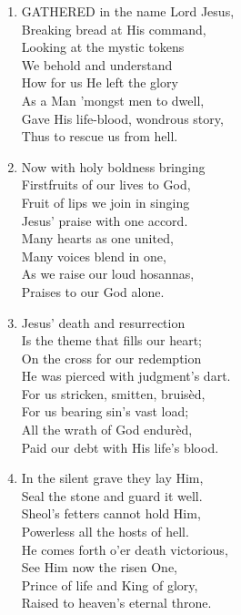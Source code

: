 \begin{enumerate}
    \item GATHERED in the name Lord Jesus, \\
        Breaking bread at His command, \\
        Looking at the mystic tokens \\
        We behold and understand \\
        How for us He left the glory \\
        As a Man 'mongst men to dwell, \\
        Gave His life-blood, wondrous story, \\
        Thus to rescue us from hell.

    \item Now with holy boldness bringing \\
        Firstfruits of our lives to God, \\
        Fruit of lips we join in singing \\
        Jesus' praise with one accord. \\
        Many hearts as one united, \\
        Many voices blend in one, \\
        As we raise our loud hosannas, \\
        Praises to our God alone.

    \item Jesus' death and resurrection \\
        Is the theme that fills our heart; \\
        On the cross for our redemption \\
        He was pierced with judgment's dart. \\
        For us stricken, smitten, bruis\`ed, \\
        For us bearing sin's vast load; \\
        All the wrath of God endur\`ed, \\
        Paid our debt with His life's blood.

    \item In the silent grave they lay Him, \\
        Seal the stone and guard it well. \\
        Sheol's fetters cannot hold Him, \\
        Powerless all the hosts of hell. \\
        He comes forth o'er death victorious, \\
        See Him now the risen One, \\
        Prince of life and King of glory, \\
        Raised to heaven's eternal throne.


\end{enumerate}
